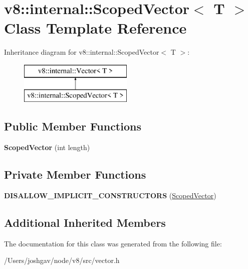 \hypertarget{classv8_1_1internal_1_1_scoped_vector}{}\section{v8\+:\+:internal\+:\+:Scoped\+Vector$<$ T $>$ Class Template Reference}
\label{classv8_1_1internal_1_1_scoped_vector}
Inheritance diagram for v8\+:\+:internal\+:\+:Scoped\+Vector$<$ T $>$\+:\begin{figure}[H]
\begin{center}
\leavevmode
\includegraphics[height=2.000000cm]{classv8_1_1internal_1_1_scoped_vector}
\end{center}
\end{figure}
\subsection*{Public Member Functions}
\begin{DoxyCompactItemize}
\item 
{\bfseries Scoped\+Vector} (int length)\hypertarget{classv8_1_1internal_1_1_scoped_vector_abf437127696dc144a2be43af4130f3c7}{}\label{classv8_1_1internal_1_1_scoped_vector_abf437127696dc144a2be43af4130f3c7}

\end{DoxyCompactItemize}
\subsection*{Private Member Functions}
\begin{DoxyCompactItemize}
\item 
{\bfseries D\+I\+S\+A\+L\+L\+O\+W\+\_\+\+I\+M\+P\+L\+I\+C\+I\+T\+\_\+\+C\+O\+N\+S\+T\+R\+U\+C\+T\+O\+RS} (\hyperlink{classv8_1_1internal_1_1_scoped_vector}{Scoped\+Vector})\hypertarget{classv8_1_1internal_1_1_scoped_vector_ad1e87fde060e8d1a9b51a1680640a6a8}{}\label{classv8_1_1internal_1_1_scoped_vector_ad1e87fde060e8d1a9b51a1680640a6a8}

\end{DoxyCompactItemize}
\subsection*{Additional Inherited Members}


The documentation for this class was generated from the following file\+:\begin{DoxyCompactItemize}
\item 
/\+Users/joshgav/node/v8/src/vector.\+h\end{DoxyCompactItemize}
